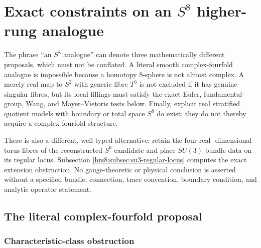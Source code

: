 
\section{Exact constraints on an \texorpdfstring{$S^8$}{S8} higher-rung analogue}
\label{hrs8:sec:constraints}

The phrase ``an $S^8$ analogue'' can denote three mathematically different
proposals, which must not be conflated.  A literal smooth complex-fourfold
analogue is impossible because a homotopy $8$-sphere is not almost complex.
A merely real map to $S^2$ with generic fibre $T^6$ is not excluded if it has
genuine singular fibres, but its local fillings must satisfy the exact Euler,
fundamental-group, Wang, and Mayer--Vietoris tests below.  Finally, explicit
real stratified quotient models with boundary or total space $S^8$ do exist;
they do not thereby acquire a complex-fourfold structure.

There is also a different, well-typed alternative: retain the four-real-
dimensional torus fibres of the reconstructed $S^6$ candidate and place
$SU(3)$ bundle data on its regular locus.  Subsection
\ref{hrs8:subsec:su3-regular-locus} computes the exact extension obstruction.
No gauge-theoretic or physical conclusion is asserted without a specified
bundle, connection, trace convention, boundary condition, and analytic
operator statement.

\subsection{The literal complex-fourfold proposal}
\label{hrs8:subsec:no-almost-complex}

\subsubsection{Characteristic-class obstruction}
\label{hrs8:subsubsec:characteristic-class}

